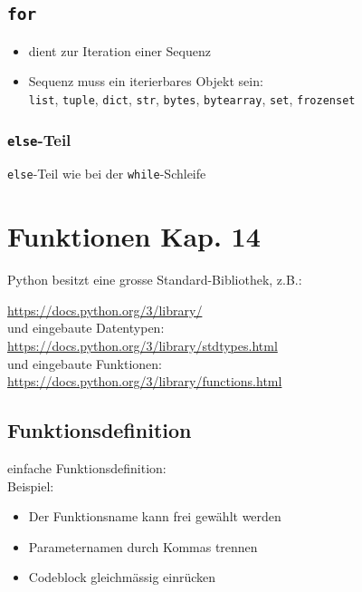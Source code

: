 \subsection{\texttt{for}}

\begin{itemize}
	\item dient zur Iteration einer Sequenz
	\item Sequenz muss ein iterierbares Objekt sein:\\
	\texttt{list}, \texttt{tuple}, \texttt{dict}, \texttt{str}, \texttt{bytes}, \texttt{bytearray}, \texttt{set}, \texttt{frozenset}
\end{itemize}

\subsubsection{\texttt{else}-Teil}

\texttt{else}-Teil wie bei der \texttt{while}-Schleife

\section[Funktionen]{Funktionen \tiny{Kap. 14}}
Python besitzt eine grosse Standard-Bibliothek, z.B.:

\url{https://docs.python.org/3/library/}\\

und eingebaute Datentypen:\\
\url{https://docs.python.org/3/library/stdtypes.html}\\

und eingebaute Funktionen:\\
\url{https://docs.python.org/3/library/functions.html}

\subsection{Funktionsdefinition}
einfache Funktionsdefinition:\\


Beispiel:\\


\begin{itemize}
	\item Der Funktionsname kann frei gewählt werden
	\item Parameternamen durch Kommas trennen
	\item Codeblock gleichmässig einrücken
\end{itemize}

